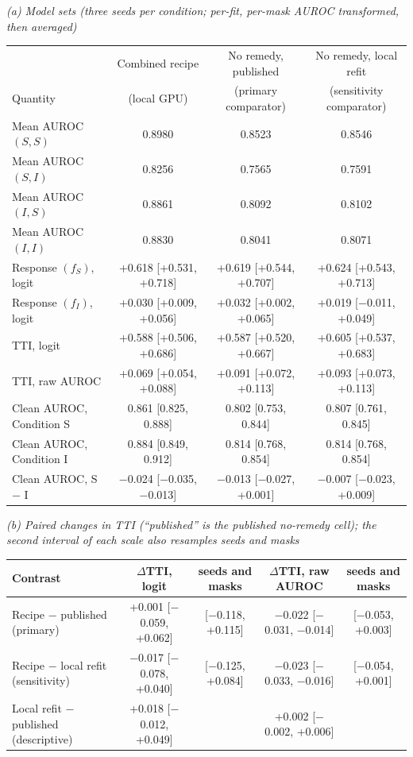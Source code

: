 \textit{(a) Model sets (three seeds per condition; per-fit, per-mask AUROC transformed, then averaged)}\\[2pt]
\begin{tabular}{@{}lccc@{}}
\toprule
 & Combined recipe & No remedy, published & No remedy, local refit \\
Quantity & (local GPU) & (primary comparator) & (sensitivity comparator) \\
\midrule
Mean AUROC $(S,S)$ & 0.8980 & 0.8523 & 0.8546 \\
Mean AUROC $(S,I)$ & 0.8256 & 0.7565 & 0.7591 \\
Mean AUROC $(I,S)$ & 0.8861 & 0.8092 & 0.8102 \\
Mean AUROC $(I,I)$ & 0.8830 & 0.8041 & 0.8071 \\
Response \R{}$(f_S)$, logit & +0.618 [+0.531, +0.718] & +0.619 [+0.544, +0.707] & +0.624 [+0.543, +0.713] \\
Response \R{}$(f_I)$, logit & +0.030 [+0.009, +0.056] & +0.032 [+0.002, +0.065] & +0.019 [$-$0.011, +0.049] \\
TTI, logit & +0.588 [+0.506, +0.686] & +0.587 [+0.520, +0.667] & +0.605 [+0.537, +0.683] \\
TTI, raw AUROC & +0.069 [+0.054, +0.088] & +0.091 [+0.072, +0.113] & +0.093 [+0.073, +0.113] \\
Clean AUROC, Condition S & 0.861 [0.825, 0.888] & 0.802 [0.753, 0.844] & 0.807 [0.761, 0.845] \\
Clean AUROC, Condition I & 0.884 [0.849, 0.912] & 0.814 [0.768, 0.854] & 0.814 [0.768, 0.854] \\
Clean AUROC, S $-$ I & $-$0.024 [$-$0.035, $-$0.013] & $-$0.013 [$-$0.027, +0.001] & $-$0.007 [$-$0.023, +0.009] \\
\bottomrule
\end{tabular}

\medskip
\textit{(b) Paired changes in TTI (``published'' is the published no-remedy cell); the second interval of each scale also resamples seeds and masks}\\[2pt]
\begin{tabular}{@{}lcccc@{}}
\toprule
Contrast & $\Delta$TTI, logit & seeds and masks & $\Delta$TTI, raw AUROC & seeds and masks \\
\midrule
Recipe $-$ published (primary) & +0.001 [$-$0.059, +0.062] & [$-$0.118, +0.115] & $-$0.022 [$-$0.031, $-$0.014] & [$-$0.053, +0.003] \\
Recipe $-$ local refit (sensitivity) & $-$0.017 [$-$0.078, +0.040] & [$-$0.125, +0.084] & $-$0.023 [$-$0.033, $-$0.016] & [$-$0.054, +0.001] \\
Local refit $-$ published (descriptive) & +0.018 [$-$0.012, +0.049] & & +0.002 [$-$0.002, +0.006] & \\
\bottomrule
\end{tabular}

